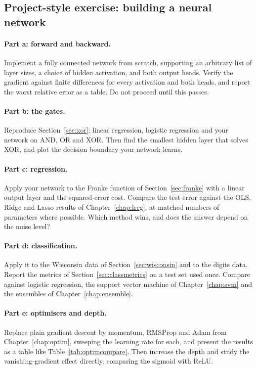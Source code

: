 \subsection*{Project-style exercise: building a neural network}

\paragraph{Part a: forward and backward.}
Implement a fully connected network from scratch, supporting an arbitrary list
of layer sizes, a choice of hidden activation, and both output heads.  Verify
the gradient against finite differences for every activation and both heads,
and report the worst relative error as a table.  Do not proceed until this
passes.

\paragraph{Part b: the gates.}
Reproduce Section~\ref{sec:xor}: linear regression, logistic regression and
your network on AND, OR and XOR.  Then find the smallest hidden layer that
solves XOR, and plot the decision boundary your network learns.

\paragraph{Part c: regression.}
Apply your network to the Franke function of Section~\ref{sec:franke} with a
linear output layer and the squared-error cost.  Compare the test error against
the OLS, Ridge and Lasso results of Chapter~\ref{chap:lreg}, at matched numbers
of parameters where possible.  Which method wins, and does the answer depend on
the noise level?

\paragraph{Part d: classification.}
Apply it to the Wisconsin data of Section~\ref{sec:wisconsin} and to the digits
data.  Report the metrics of Section~\ref{sec:classmetrics} on a test set used
once.  Compare against logistic regression, the support vector machine of
Chapter~\ref{chap:svm} and the ensembles of Chapter~\ref{chap:ensemble}.

\paragraph{Part e: optimisers and depth.}
Replace plain gradient descent by momentum, RMSProp and Adam from
Chapter~\ref{chap:optim}, sweeping the learning rate for each, and present the
results as a table like Table~\ref{tab:optimcompare}.  Then increase the depth
and study the vanishing-gradient effect directly, comparing the sigmoid with
ReLU.

